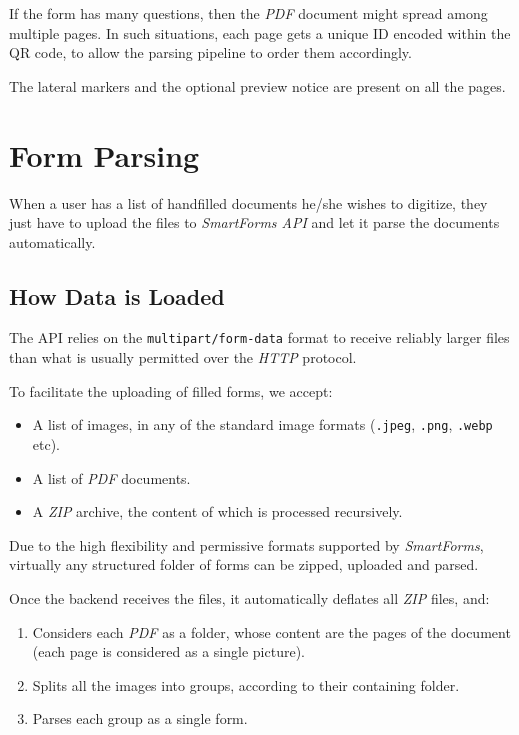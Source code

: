 \documentclass[11pt, a4paper]{report}
\def\code#1{\texttt{#1}}
\begin{document}
If the form has many questions, then the \textit{PDF} document might spread among multiple pages. In such situations, each page gets a unique ID encoded within the QR code, to allow the parsing pipeline to order them accordingly.

The lateral markers and the optional preview notice are present on all the pages.



\chapter{Form Parsing}

When a user has a list of handfilled documents he/she wishes to digitize, they just have to upload the files to \textit{SmartForms API} and let it parse the documents automatically.

\section{How Data is Loaded}

The API relies on the \code{multipart/form-data}\cite{masinter1998rfc2388} format to receive reliably larger files than what is usually permitted over the \textit{HTTP} protocol.

To facilitate the uploading of filled forms, we accept:
\begin{itemize}
    \item A list of images, in any of the standard image formats (\code{.jpeg}, \code{.png}, \code{.webp} etc).
    \item A list of \textit{PDF} documents.
    \item A \textit{ZIP} archive, the content of which is processed recursively.
\end{itemize}

Due to the high flexibility and permissive formats supported by \textit{SmartForms}, virtually any structured folder of forms can be zipped, uploaded and parsed.

Once the backend receives the files, it automatically deflates all \textit{ZIP} files, and:
\begin{enumerate}
    \item Considers each \textit{PDF} as a folder, whose content are the pages of the document (each page is considered as a single picture).
    \item Splits all the images into groups, according to their containing folder.
    \item Parses each group as a single form.
\end{enumerate}
\end{document}
